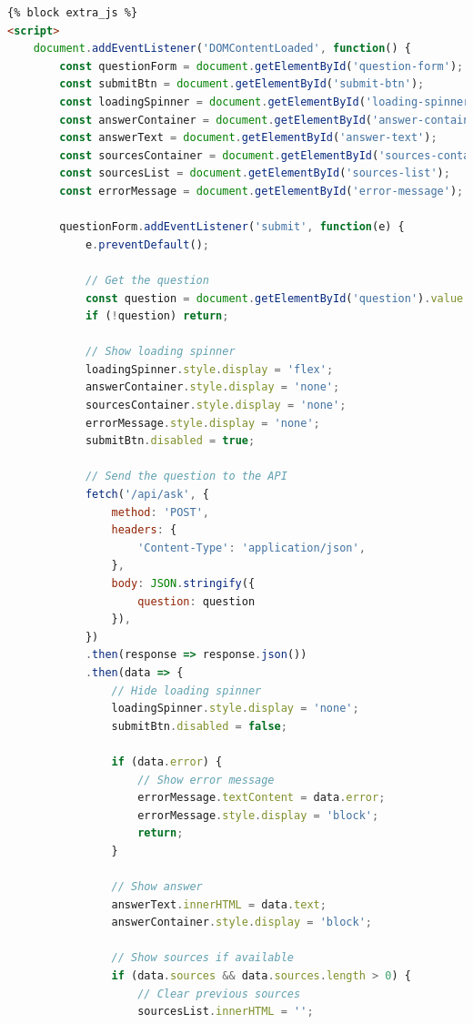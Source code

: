\documentclass[
  screen,review,acmlarge]{acmart}
\begin{document}
\begin{lstlisting}[language=HTML]
{% block extra_js %}
<script>
    document.addEventListener('DOMContentLoaded', function() {
        const questionForm = document.getElementById('question-form');
        const submitBtn = document.getElementById('submit-btn');
        const loadingSpinner = document.getElementById('loading-spinner');
        const answerContainer = document.getElementById('answer-container');
        const answerText = document.getElementById('answer-text');
        const sourcesContainer = document.getElementById('sources-container');
        const sourcesList = document.getElementById('sources-list');
        const errorMessage = document.getElementById('error-message');
        
        questionForm.addEventListener('submit', function(e) {
            e.preventDefault();
            
            // Get the question
            const question = document.getElementById('question').value.trim();
            if (!question) return;
            
            // Show loading spinner
            loadingSpinner.style.display = 'flex';
            answerContainer.style.display = 'none';
            sourcesContainer.style.display = 'none';
            errorMessage.style.display = 'none';
            submitBtn.disabled = true;
            
            // Send the question to the API
            fetch('/api/ask', {
                method: 'POST',
                headers: {
                    'Content-Type': 'application/json',
                },
                body: JSON.stringify({
                    question: question
                }),
            })
            .then(response => response.json())
            .then(data => {
                // Hide loading spinner
                loadingSpinner.style.display = 'none';
                submitBtn.disabled = false;
                
                if (data.error) {
                    // Show error message
                    errorMessage.textContent = data.error;
                    errorMessage.style.display = 'block';
                    return;
                }
                
                // Show answer
                answerText.innerHTML = data.text;
                answerContainer.style.display = 'block';
                
                // Show sources if available
                if (data.sources && data.sources.length > 0) {
                    // Clear previous sources
                    sourcesList.innerHTML = '';
                    

\end{lstlisting}
\end{document}
